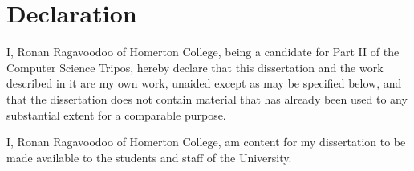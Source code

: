 \documentclass[final,rdr32.tex]{subfiles}
\begin{document}
\clearpage
\section*{Declaration}

I, Ronan Ragavoodoo of Homerton College, being a candidate for Part II of the Computer
Science Tripos, hereby declare that this dissertation and the work described in it are my own work, unaided except as may be specified below, and that the dissertation does not contain material that has already been used to any substantial extent for a comparable purpose.

\bigskip

\noindent I, Ronan Ragavoodoo of Homerton College, am content for my dissertation to be made
available to the students and staff of the University.

\bigskip


\par\noindent{} \hfill\makebox[2.0in]{\today}%
\vspace{-12pt}
\par\noindent\makebox[2.5in]{\hrulefill} \hfill\makebox[2.0in]{\hrulefill}%
\par\noindent{}      \hfill{}%
\end{document}
